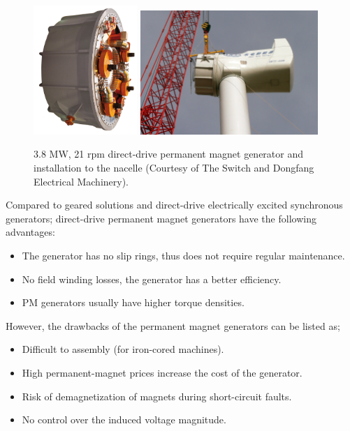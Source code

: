 \documentclass[a4paper, 11pt]{article} %
\begin{document}
  \begin{figure}
    \centering
    \includegraphics[width=0.35\textwidth]{switch}
    \hfill
    \includegraphics[width=0.6\textwidth]{switch_turbine}
    \caption{3.8 MW, 21 rpm direct-drive permanent magnet generator and installation to the nacelle (Courtesy of The Switch and Dongfang Electrical Machinery).} 
    \label{switch}
  \end{figure}

Compared to geared solutions and direct-drive electrically excited synchronous generators; direct-drive permanent magnet generators have the following advantages:

\begin{itemize}
	\item The generator has no slip rings, thus does not require regular maintenance.
	\item No field winding losses, the generator has a better efficiency.
	\item PM generators usually have higher torque densities.
\end{itemize}

However, the drawbacks of the permanent magnet generators can be listed as;

\begin{itemize}
	\item Difficult to assembly (for iron-cored machines).
	\item High permanent-magnet prices increase the cost of the generator.
	\item Risk of demagnetization of magnets during short-circuit faults.
	\item No control over the induced voltage magnitude.
\end{itemize}
\end{document}
